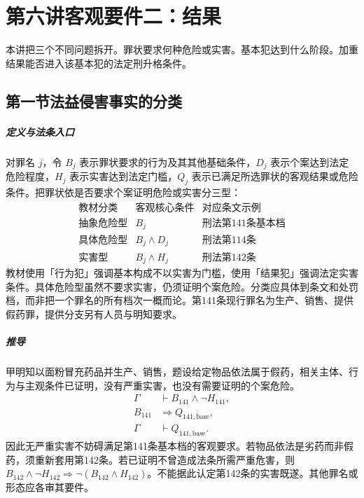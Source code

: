 \chapter{第六讲\quad 客观要件二：结果}
\label{lecture:06}
\par

本讲把三个不同问题拆开。罪状要求何种危险或实害。基本犯达到什么阶段。加重结果能否进入该基本犯的法定刑升格条件。

\section{第一节\quad 法益侵害事实的分类}

\paragraph{定义与法条入口}
对罪名 $j$，令 $B_j$ 表示罪状要求的行为及其其他基础条件，$D_j$ 表示个案达到法定危险程度，$H_j$ 表示实害达到法定门槛，$Q_j$ 表示已满足所选罪状的客观结果或危险条件。把罪状依是否要求个案证明危险或实害分三型：
\[
\begin{array}{c|c|l}
\text{教材分类} & \text{客观核心条件} & \text{对应条文示例}\\ \hline
\text{抽象危险型} & B_j & \text{刑法第141条基本档}\\
\text{具体危险型} & B_j\land D_j & \text{刑法第114条}\\
\text{实害型} & B_j\land H_j & \text{刑法第142条}
\end{array}
\]
教材使用「行为犯」强调基本构成不以实害为门槛，使用「结果犯」强调法定实害条件。具体危险型虽然不要求实害，仍须证明个案危险。分类应具体到条文和处罚档，而非把一个罪名的所有档次一概而论。第141条现行罪名为生产、销售、提供假药罪，提供分支另有人员与明知要求。

\paragraph{推导}
甲明知以面粉冒充药品并生产、销售，题设给定物品依法属于假药，相关主体、行为与主观条件已证明，没有严重实害，也没有需要证明的个案危险。
\[
\begin{aligned}
\Gamma&\vdash B_{141}\land\neg H_{141},\\
B_{141}&\Longrightarrow Q_{141,\mathrm{base}},\\
\Gamma&\vdash Q_{141,\mathrm{base}} .
\end{aligned}
\]
因此无严重实害不妨碍满足第141条基本档的客观要求。若物品依法是劣药而非假药，须重新套用第142条。若已证明不曾造成法条所需严重危害，则
$B_{142}\land\neg H_{142}\Rightarrow \neg(B_{142}\land H_{142})$。不能据此认定第142条的实害既遂。其他罪名或形态应各审其要件。

